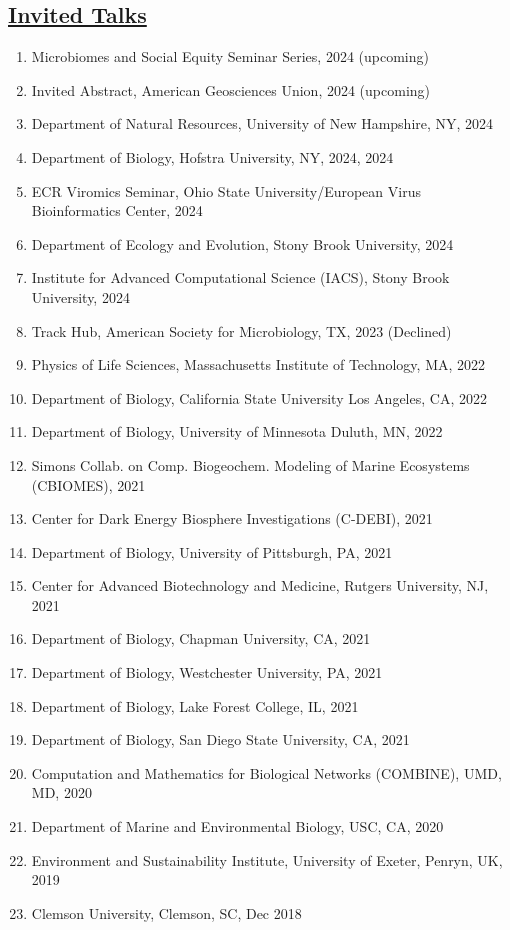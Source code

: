 \documentclass[]{res}
\begin{document}
\begin{resume}
 \newpage
  
   \section{\underline{Invited Talks}} \vspace{2mm}
    \begin{enumerate}[leftmargin=*]
\item Microbiomes and Social Equity Seminar Series, 2024 (upcoming)
\item Invited Abstract, American Geosciences Union, 2024 (upcoming)
\item Department of Natural Resources, University of New Hampshire, NY, 2024
\item Department of Biology, Hofstra University, NY, 2024, 2024
\item ECR Viromics Seminar, Ohio State University/European Virus Bioinformatics Center, 2024
\item Department of Ecology and Evolution, Stony Brook University, 2024
\item Institute for Advanced Computational Science (IACS), Stony Brook University, 2024
\item Track Hub, American Society for Microbiology, TX, 2023 (Declined)
\item Physics of Life Sciences, Massachusetts Institute of Technology, MA, 2022
\item Department of Biology, California State University Los Angeles, CA, 2022
\item Department of Biology, University of Minnesota Duluth, MN, 2022
\item Simons Collab. on Comp. Biogeochem. Modeling of Marine Ecosystems (CBIOMES), 2021
\item Center for Dark Energy Biosphere Investigations (C-DEBI), 2021
\item Department of Biology, University of Pittsburgh, PA, 2021
\item Center for Advanced Biotechnology and Medicine, Rutgers University, NJ, 2021
\item Department of Biology, Chapman University, CA, 2021
\item Department of Biology, Westchester University, PA, 2021
\item Department of Biology, Lake Forest College, IL, 2021
\item Department of Biology, San Diego State University, CA, 2021
\item Computation and Mathematics for Biological Networks (COMBINE), UMD, MD, 2020
\item Department of Marine and Environmental Biology, USC, CA, 2020
\item Environment and Sustainability Institute, University of Exeter, Penryn, UK, 2019
\item Clemson University, Clemson, SC, Dec 2018
\end{enumerate}


\end{resume}
\end{document}
